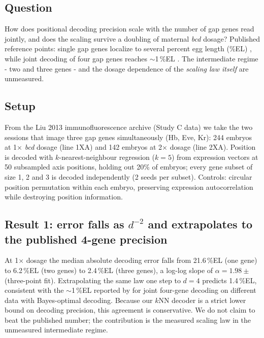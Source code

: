 \label{sec:poslaw}

\subsection{Question}

How does positional decoding precision scale with the number of gap genes read
jointly, and does the scaling survive a doubling of maternal \emph{bcd} dosage?
Published reference points: single gap genes localize to several percent egg
length (\%EL) \cite{dubuis2013}, while joint decoding of four gap genes reaches
$\sim$1\,\%EL \cite{petkova2019}. The intermediate regime - two and three genes -
and the dosage dependence of the \emph{scaling law itself} are unmeasured.

\subsection{Setup}

From the Liu 2013 immunofluorescence archive (Study C data) we take the two
sessions that image three gap genes simultaneously (Hb, Eve, Kr): 244 embryos at
1$\times$ \emph{bcd} dosage (line 1XA) and 142 embryos at 2$\times$ dosage (line
2XA). Position is decoded with $k$-nearest-neighbour regression ($k=5$) from
expression vectors at 50 subsampled axis positions, holding out 20\% of embryos;
every gene subset of size 1, 2 and 3 is decoded independently (2 seeds per
subset). Controls: circular position permutation within each embryo, preserving
expression autocorrelation while destroying position information.

\subsection{Result 1: error falls as $d^{-2}$ and extrapolates to the published
4-gene precision}

At 1$\times$ dosage the median absolute decoding error falls from 21.6\,\%EL
(one gene) to 6.2\,\%EL (two genes) to 2.4\,\%EL (three genes), a log-log slope
of $\alpha = 1.98 \pm$ (three-point fit). Extrapolating the same law one step to
$d=4$ predicts 1.4\,\%EL, consistent with the $\sim$1\,\%EL reported by
\cite{petkova2019} for joint four-gene decoding on different data with
Bayes-optimal decoding. Because our $k$NN decoder is a strict lower bound on
decoding precision, this agreement is conservative. We do not claim to beat the
published number; the contribution is the measured scaling law in the
unmeasured intermediate regime.

